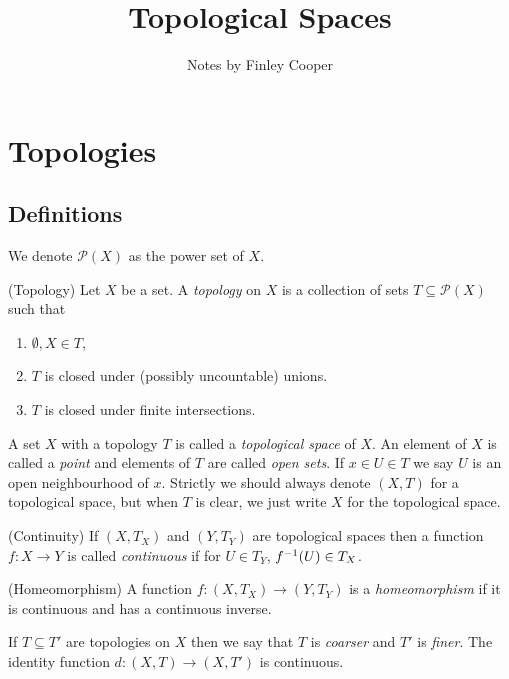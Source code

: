 \documentclass{article}
\title{Topological Spaces}
\author{Notes by Finley Cooper}
\begin{document}
  \maketitle
  \newpage
  \tableofcontents
  \newpage
  \section{Topologies}
  \subsection{Definitions}
  We denote $ \mathcal P(X) $ as the power set of $ X $.
  \begin{definition}
	  (Topology) Let $ X $ be a set. A \textit{topology} on $ X $ is a collection of sets $ T\subseteq \mathcal P(X) $ such that
	  \begin{enumerate}
		  \item $\emptyset, X\in T $,
		  \item $ T $ is closed under (possibly uncountable) unions.
		  \item $ T $ is closed under finite intersections.
	  \end{enumerate}
  \end{definition}


  A set $ X $ with a topology $ T $ is called a \textit{topological space} of $ X $. An element of $ X $ is called a \textit{point} and elements of $ T $ are called \textit{open sets}. If $ x\in U\in T $ we say $ U $ is an open neighbourhood of $ x $. Strictly we should always denote $ (X,T) $ for a topological space, but when $ T $ is clear, we just write $ X $ for the topological space.
\begin{definition}
	(Continuity) If $ (X,T_X) $ and $ (Y,T_Y) $ are topological spaces then a function $ f:X\to Y $ is called \textit{continuous} if for $ U\in T_Y $, $ {f}^{-1}(U)\in T_X $.
\end{definition}
\begin{definition}
	(Homeomorphism) A function $ f:(X,T_X)\to (Y,T_Y) $ is a \textit{homeomorphism} if it is continuous and has a continuous inverse.
\end{definition}
\begin{definition}
	If $ T\subseteq T' $ are topologies on $ X $ then we say that $ T $ is \textit{coarser} and $ T' $ is \textit{finer}. The identity function $ d: (X,T)\to (X,T') $ is continuous.
\end{definition}
\end{document}
